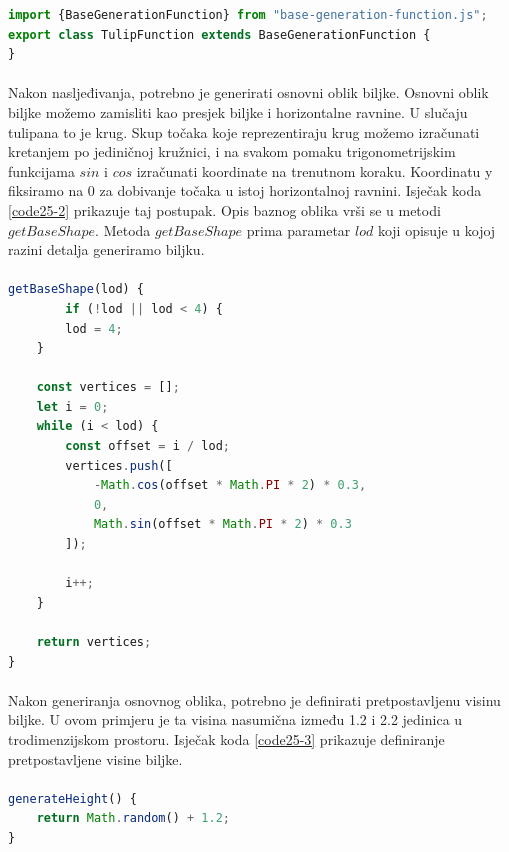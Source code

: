 \documentclass[times, utf8, diplomski]{fer}
\begin{document}
\begin{lstlisting}[language=Javascript,caption=Naslijeđivanje razreda BaseGenerationFunction,label=code25-1]
import {BaseGenerationFunction} from "base-generation-function.js";
export class TulipFunction extends BaseGenerationFunction {
}
\end{lstlisting}

\paragraph{}
Nakon nasljeđivanja, potrebno je generirati osnovni oblik biljke. Osnovni oblik biljke 
možemo zamisliti kao presjek biljke i horizontalne ravnine. U slučaju tulipana to je krug.
Skup točaka koje reprezentiraju krug možemo izračunati kretanjem po jediničnoj kružnici, i 
na svakom pomaku trigonometrijskim funkcijama $sin$ i $cos$ izračunati koordinate na 
trenutnom koraku. Koordinatu y fiksiramo na 0 za dobivanje točaka u istoj horizontalnoj 
ravnini. Isječak koda \ref{code25-2} prikazuje taj postupak. Opis baznog oblika vrši se u 
metodi $getBaseShape$. Metoda $getBaseShape$ prima parametar $lod$ koji opisuje u kojoj 
razini detalja generiramo biljku.

\paragraph{}
\begin{lstlisting}[language=Javascript,caption=Generiranje osnovnog oblika biljke,label=code25-2]
getBaseShape(lod) {
		if (!lod || lod < 4) {
		lod = 4;
	}

	const vertices = [];
	let i = 0;
	while (i < lod) {
		const offset = i / lod;
		vertices.push([
			-Math.cos(offset * Math.PI * 2) * 0.3,
			0,
			Math.sin(offset * Math.PI * 2) * 0.3
		]);

		i++;
	}

	return vertices;
}
\end{lstlisting}

\paragraph{}
Nakon generiranja osnovnog oblika, potrebno je definirati pretpostavljenu visinu biljke.
U ovom primjeru je ta visina nasumična između 1.2 i 2.2 jedinica u trodimenzijskom 
prostoru. Isječak koda \ref{code25-3} prikazuje definiranje pretpostavljene visine biljke.
\paragraph{}
\begin{lstlisting}[language=Javascript,caption=Generiranje visine biljke,label=code25-3]
generateHeight() {
	return Math.random() + 1.2;
}
\end{lstlisting}
\end{document}
